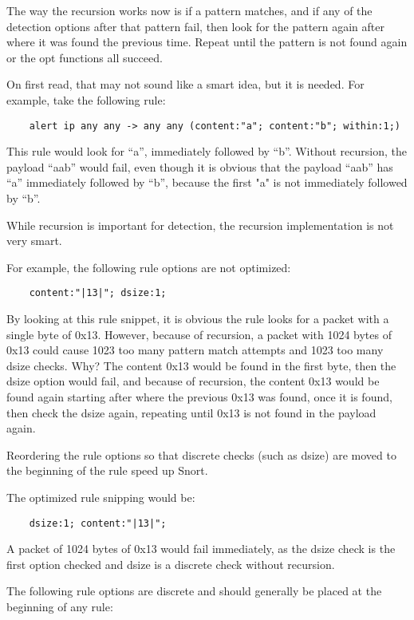 \documentclass[english]{report}
\begin{document}
The way the recursion works now is if a pattern matches, and if any of the
detection options after that pattern fail, then look for the pattern again
after where it was found the previous time.  Repeat until the pattern is not
found again or the opt functions all succeed.

On first read, that may not sound like a smart idea, but it is needed.  For
example, take the following rule:

\begin{verbatim}
    alert ip any any -> any any (content:"a"; content:"b"; within:1;)
\end{verbatim}

This rule would look for ``a'', immediately followed by ``b''.  Without
recursion, the payload ``aab'' would fail, even though it is obvious that the
payload ``aab'' has ``a'' immediately followed by ``b'', because the first "a"
is not immediately followed by ``b''.

While recursion is important for detection, the recursion implementation is not
very smart.

For example, the following rule options are not optimized:

\begin{verbatim}
    content:"|13|"; dsize:1;
\end{verbatim}

By looking at this rule snippet, it is obvious the rule looks for a packet with
a single byte of 0x13.  However, because of recursion, a packet with 1024 bytes
of 0x13 could cause 1023 too many pattern match attempts and 1023 too many
dsize checks.  Why?  The content 0x13 would be found in the first byte, then
the dsize option would fail, and because of recursion, the content 0x13 would
be found again starting after where the previous 0x13 was found, once it is
found, then check the dsize again, repeating until 0x13 is not found in the
payload again.

Reordering the rule options so that discrete checks (such as dsize) are moved
to the beginning of the rule speed up Snort.  

The optimized rule snipping would be:
\begin{verbatim}
    dsize:1; content:"|13|";
\end{verbatim}

A packet of 1024 bytes of 0x13 would fail immediately, as the dsize check is
the first option checked and dsize is a discrete check without recursion.

The following rule options are discrete and should generally be placed at the
beginning of any rule:
\end{document}
